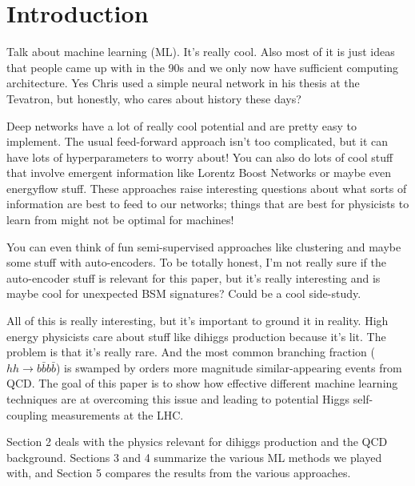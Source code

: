 \section{Introduction}
\label{sec:intro}

Talk about machine learning (ML). It's really cool. Also most of it is just ideas that people came up with in the 90s and we only now have sufficient computing architecture. Yes Chris used a simple neural network in his thesis at the Tevatron, but honestly, who cares about history these days?

Deep networks have a lot of really cool potential and are pretty easy to implement. The usual feed-forward approach isn't too complicated, but it can have lots of hyperparameters to worry about! You can also do lots of cool stuff that involve emergent information like Lorentz Boost Networks or maybe even energyflow stuff. These approaches raise interesting questions about what sorts of information are best to feed to our networks; things that are best for physicists to learn from might not be optimal for machines!

You can even think of fun semi-supervised approaches like clustering and maybe some stuff with auto-encoders. To be totally honest, I'm not really sure if the auto-encoder stuff is relevant for this paper, but it's really interesting and is maybe cool for unexpected BSM signatures? Could be a cool side-study.

All of this is really interesting, but it's important to ground it in reality. High energy physicists care about stuff like dihiggs production because it's lit. The problem is that it's really rare. And the most common branching fraction ($hh\rightarrow b\bar{b}b\bar{b}$) is swamped by orders more magnitude similar-appearing events from QCD. The goal of this paper is to show how effective different machine learning techniques are at overcoming this issue and leading to potential Higgs self-coupling measurements at the LHC.

Section 2 deals with the physics relevant for dihiggs production and the QCD background. Sections 3 and 4 summarize the various ML methods we played with, and Section 5 compares the results from the various approaches.

